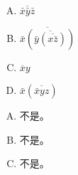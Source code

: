 {{        %
        \begin{practices}
            \begin{enumerate}[A.]
                \item $\overline{\bar{x}\bar{y}\bar{z}}$
                \item $\overline{\bar{x}(\overline{\bar{y}(\overline{x\bar{z}})})}$
                \item $\overline{x}y$
                \item $\bar{x}(\overline{\bar{x}yz})$
            \end{enumerate}
        \end{practices}

        \begin{practices}
            \begin{enumerate}[A.]
                \item $x + y + z$
                \item $x + \overline{y + \overline{(\bar{x} + z)}}$
                \item $\overline{x + \overline{y}$
                \item $\overline{x + \overline{(x + \overline{y} + \overline{z})}}$
            \end{enumerate}
        \end{practices}

        \begin{practices}

        \end{practices}

        \begin{practices}

        \end{practices}

        \begin{practices}

        \end{practices}

        \begin{practices}

        \end{practices}

        \begin{practices}

        \end{practices}

        \begin{practices}

        \end{practices}

        \begin{practices}
            \begin{enumerate}[A.]
                \item 不是。
                \item 不是。
                \item 不是。
            \end{enumerate}
        \end{practices}
    }
}
